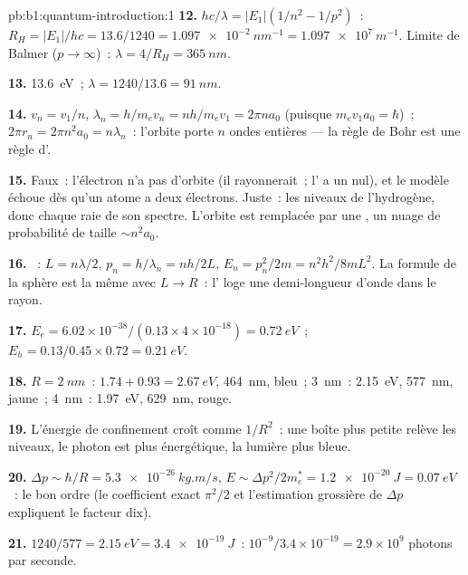 \begin{solution}{pb:b1:quantum-introduction:1}
\textbf{12.} $hc/\lambda = |E_1|(1/n^2 - 1/p^2)$~: $R_H = |E_1|/hc = 13.6/1240 =
\qty{1.097e-2}{nm^{-1}} = \qty{1.097e7}{m^{-1}}$. Limite de Balmer ($p \to \infty$)~:
$\lambda = 4/R_H = \qty{365}{nm}$.

\textbf{13.} \qty{13.6}{eV}~; $\lambda = 1240/13.6 = \qty{91}{nm}$.

\textbf{14.} $v_n = v_1/n$, $\lambda_n = h/m_ev_n = nh/m_ev_1 = 2\pi na_0$ (puisque $m_ev_1a_0
= \hbar$)~; $2\pi r_n = 2\pi n^2a_0 = n\lambda_n$~: l'orbite porte $n$ ondes
entières --- la règle de Bohr est une règle d'.

\textbf{15.} Faux~: l'électron n'a pas d'orbite (il rayonnerait~; l' a un  nul), et le modèle échoue dès qu'un atome
a deux électrons. Juste~: les niveaux de l'hydrogène, donc chaque raie de son
spectre. L'orbite est remplacée par une , un nuage de
probabilité de taille $\sim n^2a_0$.

\textbf{16.} ~: $L = n\lambda/2$, $p_n = h/\lambda_n = nh/2L$, $E_n =
p_n^2/2m = n^2h^2/8mL^2$. La formule de la sphère est la même avec $L \to R$~:
l' loge une demi-longueur d'onde dans le rayon.

\textbf{17.} $E_e = 6.02 \times 10^{-38}/(0.13 \times 4 \times 10^{-18}) = \qty{0.72}{eV}$~;
$E_h = 0.13/0.45 \times 0.72 = \qty{0.21}{eV}$.

\textbf{18.} $R = \qty{2}{nm}$~: $1.74 + 0.93 = \qty{2.67}{eV}$, \qty{464}{nm}, bleu~;
\qty{3}{nm}~: \qty{2.15}{eV}, \qty{577}{nm}, jaune~; \qty{4}{nm}~: \qty{1.97}{eV},
\qty{629}{nm}, rouge.

\textbf{19.} L'énergie de confinement croît comme $1/R^2$~: une boîte plus petite
relève les niveaux, le photon est plus énergétique, la lumière plus bleue.

\textbf{20.} $\Delta p \sim \hbar/R = \qty{5.3e-26}{kg.m/s}$, $E \sim \Delta p^2/2m_e^\ast =
\qty{1.2e-20}{J} = \qty{0.07}{eV}$~: le bon ordre (le coefficient exact
$\pi^2/2$ et l'estimation grossière de $\Delta p$ expliquent le facteur dix).

\textbf{21.} $1240/577 = \qty{2.15}{eV} = \qty{3.4e-19}{J}$~: $10^{-9}/3.4 \times 10^{-19}
= 2.9 \times 10^9$ photons par seconde.


\end{solution}
